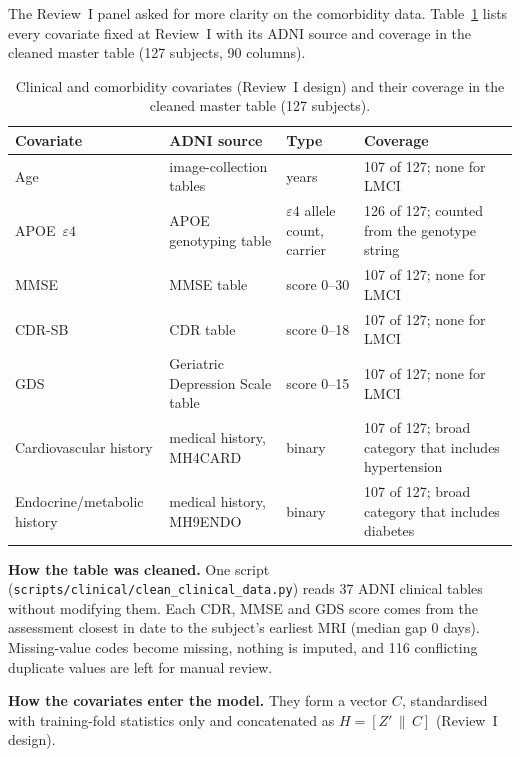 \documentclass{ssnreview}
\begin{document}
The Review~I panel asked for more clarity on the comorbidity data. Table~\ref{tab:comorb}
lists every covariate fixed at Review~I with its ADNI source and coverage in the cleaned
master table (127 subjects, 90 columns).

\begin{table}[!htbp]
\centering
\caption{Clinical and comorbidity covariates (Review~I design) and their coverage in the cleaned master table (127 subjects).}
\label{tab:comorb}
\footnotesize
\begin{tabularx}{\textwidth}{@{}>{\raggedright\arraybackslash}p{2.9cm}>{\raggedright\arraybackslash}p{3.1cm}>{\raggedright\arraybackslash}p{1.9cm}X@{}}
\toprule
\textbf{Covariate} & \textbf{ADNI source} & \textbf{Type} & \textbf{Coverage} \\
\midrule
Age & image-collection tables & years & 107 of 127; none for LMCI \\
APOE~$\varepsilon4$ & APOE genotyping table & $\varepsilon4$ allele count, carrier & 126 of 127; counted from the genotype string \\
MMSE & MMSE table & score 0--30 & 107 of 127; none for LMCI \\
CDR-SB & CDR table & score 0--18 & 107 of 127; none for LMCI \\
GDS & Geriatric Depression Scale table & score 0--15 & 107 of 127; none for LMCI \\
Cardiovascular history & medical history, MH4CARD & binary & 107 of 127; broad category that includes hypertension \\
Endocrine/metabolic history & medical history, MH9ENDO & binary & 107 of 127; broad category that includes diabetes \\
\bottomrule
\end{tabularx}
\end{table}

\textbf{How the table was cleaned.} One script (\texttt{scripts/\allowbreak clinical/\allowbreak clean\_\allowbreak clinical\_\allowbreak data.py}) reads 37
ADNI clinical tables without modifying them. Each CDR, MMSE and GDS score comes from the assessment closest in date
to the subject's earliest MRI (median gap 0 days). Missing-value codes become missing, nothing is imputed, and 116
conflicting duplicate values are left for manual review.

\textbf{How the covariates enter the model.} They form a vector $C$, standardised with training-fold statistics
only and concatenated as $H=[Z'\,\|\,C]$ (Review~I design).
\end{document}
